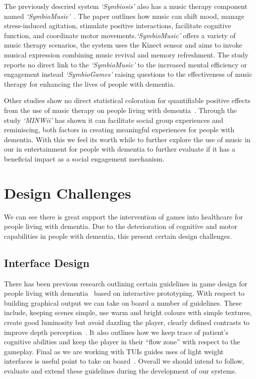 The previously descried system \emph{`Symbiosis'} also has a music therapy component named \emph{`SymbioMusic'}~\cite{symbiosis}. The paper outlines how music can shift mood, manage stress-induced agitation, stimulate positive interactions, facilitate cognitive function, and coordinate motor movements.\emph{`SymbioMusic'} offers a variety of music therapy scenarios, the system uses the Kinect sensor and aims to invoke musical expression combining music revival and memory refreshment. The study reports no direct link to the \emph{`SymbioMusic'} to the increased mental efficiency or engagement instead  \emph{`SymbioGames'} raising questions to the effectiveness of music therapy for enhancing the lives of people with dementia.

Other studies show no direct statistical coloration for quantifiable positive effects from the use of music therapy on people living with dementia~\cite{vink2003}. Through the study \emph{`MINWii'} has shown it can facilitate social group experiences and reminiscing, both factors in creating meaningful experiences for people with dementia. With this we feel its worth while to further explore the use of music in our in entertainment for people with dementia to further evaluate if it has a beneficial impact as a social engagement mechanism.

\section{Design Challenges}
We can see there is great support the intervention of games into healthcare for people living with dementia.
Due to the deterioration of cognitive and motor capabilities in people with dementia, this present certain design challenges.

\subsection{Interface Design}
There has been previous research outlining certain guidelines in game design for people living with dementia~\cite{Bouchard2012} based on interactive prototyping. 
With respect to building graphical output we can take on board a number of guidelines.
These include, keeping scenes simple, use warm and bright colours with simple textures, create good luminosity but avoid dazzling the player, clearly defined contrasts to improve depth perception~\cite{Bouchard2012}.
It also outlines how we keep trace of patient's cognitive abilities and keep the player in their ``flow zone'' with respect to the gameplay.
Final as we are working with TUIs guides uses of light weight interfaces is useful point to take on board~\cite{Bouchard2012}.
Overall we should intend to follow, evaluate and extend these guidelines during the development of our systems.

